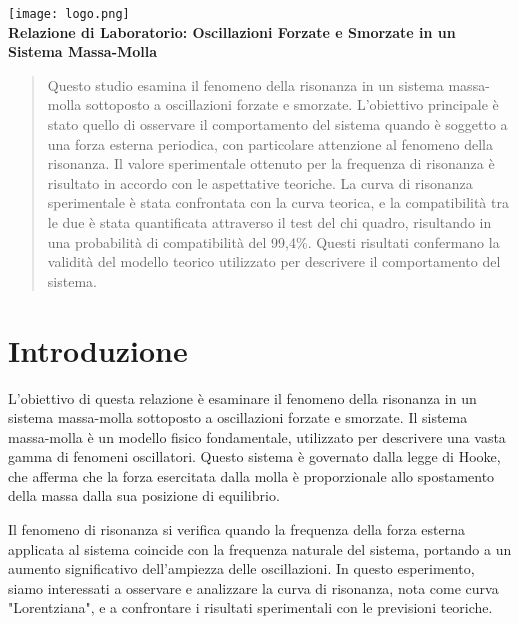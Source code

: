 \documentclass[12pt]{article}
\begin{document}
\thispagestyle{firstpage} %

\begin{center}
    \texttt{[image: logo.png]} \\[1cm] %
    \Large\textbf{Relazione di Laboratorio: Oscillazioni Forzate e Smorzate in un Sistema Massa-Molla} \\ %
\end{center}

\vspace*{1cm} %

\begin{abstract}
Questo studio esamina il fenomeno della risonanza in un sistema massa-molla sottoposto a oscillazioni forzate e smorzate. L'obiettivo principale è stato quello di osservare il comportamento del sistema quando è soggetto a una forza esterna periodica, con particolare attenzione al fenomeno della risonanza. Il valore sperimentale ottenuto per la frequenza di risonanza è risultato in accordo con le aspettative teoriche. La curva di risonanza sperimentale è stata confrontata con la curva teorica, e la compatibilità tra le due è stata quantificata attraverso il test del chi quadro, risultando in una probabilità di compatibilità del 99,4\%. Questi risultati confermano la validità del modello teorico utilizzato per descrivere il comportamento del sistema.
\end{abstract}


\section{Introduzione}

L'obiettivo di questa relazione è esaminare il fenomeno della risonanza in un sistema massa-molla sottoposto a oscillazioni forzate e smorzate. Il sistema massa-molla è un modello fisico fondamentale, utilizzato per descrivere una vasta gamma di fenomeni oscillatori. Questo sistema è governato dalla legge di Hooke, che afferma che la forza esercitata dalla molla è proporzionale allo spostamento della massa dalla sua posizione di equilibrio.

Il fenomeno di risonanza si verifica quando la frequenza della forza esterna applicata al sistema coincide con la frequenza naturale del sistema, portando a un aumento significativo dell'ampiezza delle oscillazioni. In questo esperimento, siamo interessati a osservare e analizzare la curva di risonanza, nota come curva "Lorentziana", e a confrontare i risultati sperimentali con le previsioni teoriche.
\end{document}
